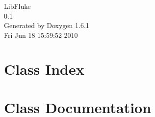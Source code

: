 \documentclass[a4paper]{book}
\begin{document}
\hypersetup{pageanchor=false}
\begin{titlepage}
\vspace*{7cm}
\begin{center}
{\Large LibFluke \\[1ex]\large 0.1 }\\
\vspace*{1cm}
{\large Generated by Doxygen 1.6.1}\\
\vspace*{0.5cm}
{\small Fri Jun 18 15:59:52 2010}\\
\end{center}
\end{titlepage}
\clearemptydoublepage
{}
\tableofcontents
\clearemptydoublepage
{}
\hypersetup{pageanchor=true}
\chapter{Class Index}

\chapter{Class Documentation}













\printindex
\end{document}
